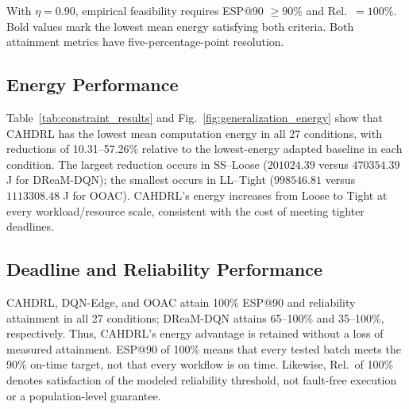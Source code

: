 \documentclass[journal]{IEEEtran}
\begin{document}
With $\eta=0.90$, empirical feasibility requires
ESP@90 $\geq90\%$ and Rel.\ $=100\%$.
Bold values mark the lowest mean energy satisfying
both criteria. Both attainment metrics have
five-percentage-point resolution.

\subsection{Energy Performance}
\label{subsec:energy_results}
Table~\ref{tab:constraint_results} and Fig.~\ref{fig:generalization_energy} show that CAHDRL has the lowest mean computation energy in all 27 conditions, with reductions of 10.31--57.26\% relative to the lowest-energy adapted baseline in each condition. The largest reduction occurs in SS--Loose ($201024.39$ versus $470354.39$ J for DReaM-DQN); the smallest occurs in LL--Tight ($998546.81$ versus $1113308.48$ J for OOAC). CAHDRL's energy increases from Loose to Tight at every workload/resource scale, consistent with the cost of meeting tighter deadlines.
\subsection{Deadline and Reliability Performance}
\label{subsec:constraint_results}
CAHDRL, DQN-Edge, and OOAC attain 100\% ESP@90 and reliability attainment in all 27 conditions; DReaM-DQN attains 65--100\% and 35--100\%, respectively. Thus, CAHDRL's energy advantage is retained without a loss of measured attainment. ESP@90 of 100\% means that every tested batch meets the 90\% on-time target, not that every workflow is on time. Likewise, Rel.\ of 100\% denotes satisfaction of the modeled reliability threshold, not fault-free execution or a population-level guarantee.
\end{document}
